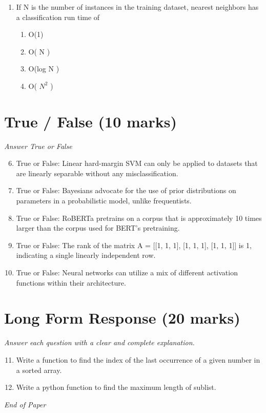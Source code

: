 \documentclass[12pt]{article}
\begin{document}
\begin{enumerate}[label=\arabic*.]
\begin{enumerate}[label=(\alph*)]
    \item Decrease the model complexity.
    \item Reduce the noise in the training data.
\end{enumerate}
\item If N is the number of instances in the training dataset, nearest neighbors has a classification run time of
\begin{enumerate}[label=(\alph*)]
    \item O(1)
    \item O( N )
    \item O(log N )
    \item O( $N^2$ )
\end{enumerate}
\end{enumerate}

\section*{True / False (10 marks)}
\textit{Answer True or False}
\begin{enumerate}[label=\arabic*.]
\setcounter{enumi}{5}
\item True or False: Linear hard-margin SVM can only be applied to datasets that are linearly separable without any misclassification.
\item True or False: Bayesians advocate for the use of prior distributions on parameters in a probabilistic model, unlike frequentists.
\item True or False: RoBERTa pretrains on a corpus that is approximately 10 times larger than the corpus used for BERT's pretraining.
\item True or False: The rank of the matrix A = [[1, 1, 1], [1, 1, 1], [1, 1, 1]] is 1, indicating a single linearly independent row.
\item True or False: Neural networks can utilize a mix of different activation functions within their architecture.
\end{enumerate}

\section*{Long Form Response (20 marks)}
\textit{Answer each question with a clear and complete explanation.}
\begin{enumerate}[label=\arabic*.]
\setcounter{enumi}{10}
\item Write a function to find the index of the last occurrence of a given number in a sorted array.
\item Write a python function to find the maximum length of sublist.
\end{enumerate}

\vfill
\noindent\textit{End of Paper}
\end{document}
